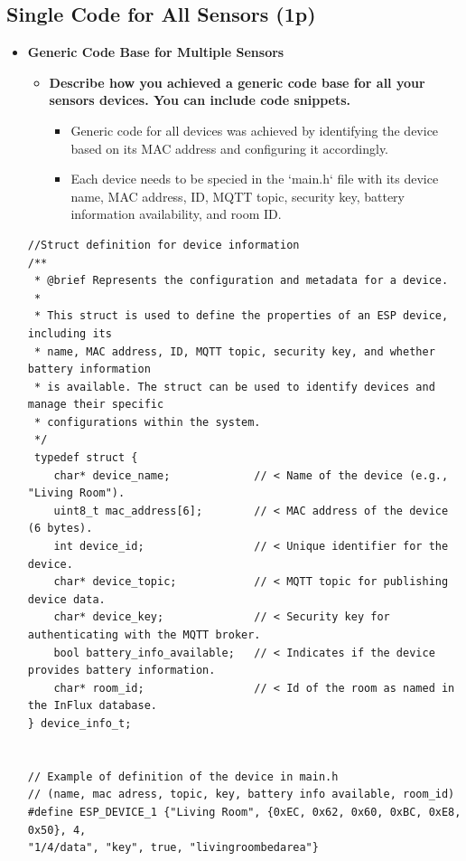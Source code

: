 \documentclass[A4,10pt]{article}
\begin{document}
\subsection{Single Code for All Sensors (1p)}

\begin{itemize}
    \item \textbf{Generic Code Base for Multiple Sensors}
    
    \begin{itemize}
		\item \textbf{Describe how you achieved a generic code base for all your sensors devices. You can include code snippets.}
		\begin{itemize}
			\item Generic code for all devices was achieved by identifying the device based on its MAC address and configuring it accordingly.
			\item Each device needs to be specied in the `main.h` file with its device name, MAC address, ID, MQTT topic, security key, battery information availability, and room ID.
		\end{itemize}
	\end{itemize}

	\begin{verbatim}
//Struct definition for device information
/**
 * @brief Represents the configuration and metadata for a device.
 *
 * This struct is used to define the properties of an ESP device, including its
 * name, MAC address, ID, MQTT topic, security key, and whether battery information
 * is available. The struct can be used to identify devices and manage their specific
 * configurations within the system.
 */
 typedef struct {
    char* device_name;             // < Name of the device (e.g., "Living Room").
    uint8_t mac_address[6];        // < MAC address of the device (6 bytes).
    int device_id;                 // < Unique identifier for the device.
    char* device_topic;            // < MQTT topic for publishing device data.
    char* device_key;              // < Security key for authenticating with the MQTT broker.
    bool battery_info_available;   // < Indicates if the device provides battery information.
    char* room_id;                 // < Id of the room as named in the InFlux database.
} device_info_t;


// Example of definition of the device in main.h
// (name, mac adress, topic, key, battery info available, room_id)
#define ESP_DEVICE_1 {"Living Room", {0xEC, 0x62, 0x60, 0xBC, 0xE8, 0x50}, 4, 
"1/4/data", "key", true, "livingroombedarea"}


\end{verbatim}
\end{itemize}
\end{document}
